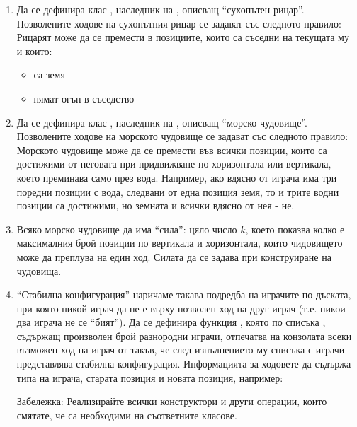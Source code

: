 \begin{enumerate}
\begin{enumerate}[label=\alph*)]
\begin{itemize}
      \end{itemize}

      \item Да се дефинира клас , наследник на , описващ ``сухопътен рицар''. Позволените ходове на сухопътния рицар се задават със следното правило: Рицарят може да се премести в позициите, които са съседни на текущата му и които:
      \begin{itemize}
        \item са земя
        \item нямат огън в съседство
      \end{itemize}

      \item Да се дефинира клас , наследник на , описващ ``морско чудовище''. Позволените ходове на морското чудовище се задават със следното правило: Морското чудовище може да се премести във всички позиции, които са достижими от неговата при придвижване по хоризонтала или вертикала, което преминава само през вода. Например, ако вдясно от играча има три поредни позиции с вода, следвани от една позиция земя, то и трите водни позиции са достижими, но земната и всички вдясно от нея - не.
      
      \item Всяко морско чудовище да има ``сила'': цяло число $k$, което показва колко е максималния брой позиции по вертикала и хоризонтала, които чидовището може да преплува на един ход. Силата да се задава при конструиране на чудовища. 

      \item ``Стабилна конфигурация'' наричаме такава подредба на играчите по дъската, при която никой играч да не е върху позволен ход на друг играч (т.е. никои два играча не се ``бият''). Да се дефинира функция , която по списъка , съдържащ произволен брой разнородни играчи, отпечатва на конзолата всеки възможен ход на играч от  такъв, че след изпълнението му списъка с играчи представлява стабилна конфигурация. Информацията за ходовете да съдържа типа на играча, старата позиция и новата позиция, например:



      \begin{flushleft}
      Забележка: Реализирайте всички конструктори и други операции, които смятате, че са необходими на съответните класове.\\


\end{flushleft}
\end{enumerate}
\end{enumerate}
